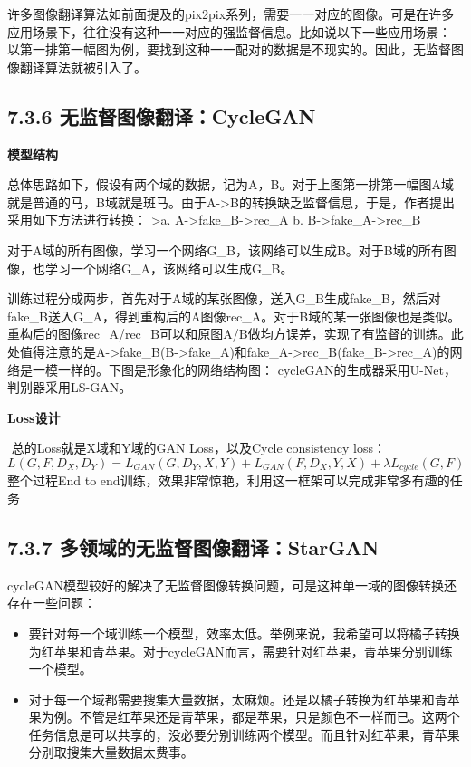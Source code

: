 ​
许多图像翻译算法如前面提及的pix2pix系列，需要一一对应的图像。可是在许多应用场景下，往往没有这种一一对应的强监督信息。比如说以下一些应用场景：
以第一排第一幅图为例，要找到这种一一配对的数据是不现实的。因此，无监督图像翻译算法就被引入了。

\subsection{7.3.6
无监督图像翻译：CycleGAN}\label{ux65e0ux76d1ux7763ux56feux50cfux7ffbux8bd1cyclegan}

\textbf{模型结构}

​
总体思路如下，假设有两个域的数据，记为A，B。对于上图第一排第一幅图A域就是普通的马，B域就是斑马。由于A-\textgreater{}B的转换缺乏监督信息，于是，作者提出采用如下方法进行转换：
\textgreater{}a. A-\textgreater{}fake\_B-\textgreater{}rec\_A b.
B-\textgreater{}fake\_A-\textgreater{}rec\_B

​
对于A域的所有图像，学习一个网络G\_B，该网络可以生成B。对于B域的所有图像，也学习一个网络G\_A，该网络可以生成G\_B。

​
训练过程分成两步，首先对于A域的某张图像，送入G\_B生成fake\_B，然后对fake\_B送入G\_A，得到重构后的A图像rec\_A。对于B域的某一张图像也是类似。重构后的图像rec\_A/rec\_B可以和原图A/B做均方误差，实现了有监督的训练。此处值得注意的是A-\textgreater{}fake\_B(B-\textgreater{}fake\_A)和fake\_A-\textgreater{}rec\_B(fake\_B-\textgreater{}rec\_A)的网络是一模一样的。下图是形象化的网络结构图：
cycleGAN的生成器采用U-Net，判别器采用LS-GAN。

\textbf{Loss设计}

​ 总的Loss就是X域和Y域的GAN Loss，以及Cycle consistency loss： \[
L(G,F,D_X,D_Y)=L_{GAN}(G,D_Y,X,Y)+L_{GAN}(F,D_X,Y,X)+\lambda L_{cycle}(G,F)
\] 整个过程End to
end训练，效果非常惊艳，利用这一框架可以完成非常多有趣的任务

\subsection{7.3.7
多领域的无监督图像翻译：StarGAN}\label{ux591aux9886ux57dfux7684ux65e0ux76d1ux7763ux56feux50cfux7ffbux8bd1stargan}

cycleGAN模型较好的解决了无监督图像转换问题，可是这种单一域的图像转换还存在一些问题：

\begin{itemize}
\item
  要针对每一个域训练一个模型，效率太低。举例来说，我希望可以将橘子转换为红苹果和青苹果。对于cycleGAN而言，需要针对红苹果，青苹果分别训练一个模型。
\item
  对于每一个域都需要搜集大量数据，太麻烦。还是以橘子转换为红苹果和青苹果为例。不管是红苹果还是青苹果，都是苹果，只是颜色不一样而已。这两个任务信息是可以共享的，没必要分别训练两个模型。而且针对红苹果，青苹果分别取搜集大量数据太费事。
\end{itemize}

